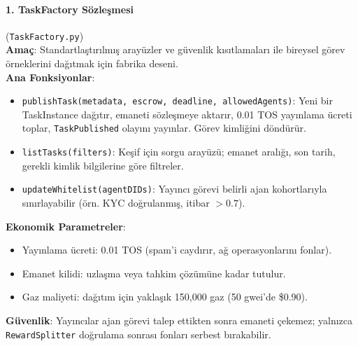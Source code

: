 \documentclass[11pt]{article}
\begin{document}
\paragraph{1. TaskFactory Sözleşmesi} (\texttt{TaskFactory.py})\\
\textbf{Amaç}: Standartlaştırılmış arayüzler ve güvenlik kısıtlamaları ile bireysel görev örneklerini dağıtmak için fabrika deseni.\\
\textbf{Ana Fonksiyonlar}:
\begin{itemize}[noitemsep]
  \item \texttt{publishTask(metadata, escrow, deadline, allowedAgents)}: Yeni bir TaskInstance dağıtır, emaneti sözleşmeye aktarır, 0.01 TOS yayınlama ücreti toplar, \texttt{TaskPublished} olayını yayınlar. Görev kimliğini döndürür.
  \item \texttt{listTasks(filters)}: Keşif için sorgu arayüzü; emanet aralığı, son tarih, gerekli kimlik bilgilerine göre filtreler.
  \item \texttt{updateWhitelist(agentDIDs)}: Yayıncı görevi belirli ajan kohortlarıyla sınırlayabilir (örn. KYC doğrulanmış, itibar $>0.7$).
\end{itemize}
\textbf{Ekonomik Parametreler}:
\begin{itemize}[noitemsep]
  \item Yayınlama ücreti: 0.01 TOS (spam'i caydırır, ağ operasyonlarını fonlar).
  \item Emanet kilidi: uzlaşma veya tahkim çözümüne kadar tutulur.
  \item Gaz maliyeti: dağıtım için yaklaşık 150,000 gaz (50 gwei'de \$0.90).
\end{itemize}
\textbf{Güvenlik}: Yayıncılar ajan görevi talep ettikten sonra emaneti çekemez; yalnızca \texttt{RewardSplitter} doğrulama sonrası fonları serbest bırakabilir.
\end{document}
